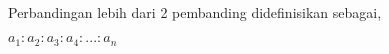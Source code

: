\paragraph*{}
	Perbandingan lebih dari 2 pembanding didefinisikan sebagai,\\
	\begin{center}
		$a_1:a_2:a_3:a_4:...:a_n$
	\end{center}
